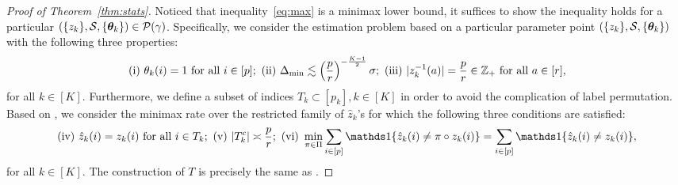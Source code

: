 \documentclass[lettersize,journal]{IEEEtran}
\theoremstyle{definition}
\theoremstyle{definition}
\begin{document}
\begin{proof}[Proof of Theorem~\ref{thm:stats}]
 Noticed that inequality~\eqref{eq:max} is a minimax lower bound, it suffices to show the inequality holds for a particular $(\{z_k\}, \mathcal{S}, \{\boldsymbol{\theta}_k\}) \in \mathcal{P}(\gamma)$. Specifically, we consider the estimation problem based on a particular parameter point $(\{z_k\}, \mathcal{S}, \{\boldsymbol{\theta}_k\})$ with the following three properties:
\begin{equation}\label{eq:construction}
    \text{(i)}\  \theta_k(i)=1 \text{ for all }i\in[p]; \  \text{(ii)}\ %
    \Delta_{\min}\lesssim  \left({p\over r}\right)^{-\frac{K-1}{2}}\sigma; \  \text{(iii)}\ |z^{-1}_k(a)|={p \over r} \in \mathbb{Z}_+ \text{ for all }a\in[r],
\end{equation}
for all $k \in [K]$.
Furthermore, we define a subset of indices $T_k \subset [p_k], k \in [K]$ in order to avoid the complication of label permutation. Based on \citet[Proof of Theorem 6]{han2020exact}, we consider the minimax rate over the restricted family of $\hat z_k$'s for which the following three conditions are satisfied:
\footnotesize
\begin{equation}
    \text{(iv)}\ \hat z_k(i)=z_k(i) \text{ for all }i\in T_k; \ \text{(v)} \ |T^c_k|\asymp {p\over r}; \ \text{(vi)}\ \min_{\pi\in \Pi}\sum_{i\in[p]}\ind\{\hat z_k(i) \neq \pi\circ z_k (i)\} = \sum_{i\in[p]}\ind\{\hat z_k(i) \neq  z_k (i)\},
\end{equation}
\normalsize
for all $k \in [K]$.
The construction of $T$ is precisely the same as \citet[Proof of Theorem 6]{han2020exact}. 

\end{proof}
\end{document}
